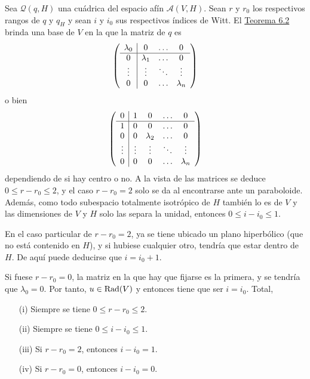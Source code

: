 \documentclass[12pt]{report}
\theoremstyle{definition}
\theoremstyle{definition}
\theoremstyle{remark}
\begin{document}
Sea $\mathcal{Q}(q,H)$ una cuádrica del espacio afín $\mathcal{A}(V,H)$. Sean $r$ y $r_0$ los respectivos rangos de $q$ y $q_H$ y sean $i$ y $i_0$ sus respectivos índices de Witt. El \hyperref[teo6.2.]{\color{blue}Teorema 6.2} brinda una base de $V$ en la que la matriz de $q$ es 
\[\left( \begin{array}{c|ccc}
    \lambda_0 & 0 & \mathellipsis & 0 \\ \hline
    0 & \lambda_1 & \mathellipsis & 0 \\
    \vdots & \vdots & \ddots & \vdots \\
    0 & 0 & \mathellipsis & \lambda_n
\end{array} \right)\]
o bien
\[\left( \begin{array}{c|cccc}
    0 & 1 & 0 & \mathellipsis & 0 \\ \hline
    1 & 0 & 0 & \mathellipsis & 0 \\
    0 & 0 & \lambda_2 & \mathellipsis & 0 \\
    \vdots & \vdots & \vdots & \ddots & \vdots \\
    0 & 0 & 0 & \mathellipsis & \lambda_n
\end{array} \right)\]
dependiendo de si hay centro o no. A la vista de las matrices se deduce $0 \leq r-r_0 \leq 2$, y el caso $r-r_0 = 2$ solo se da al encontrarse ante un paraboloide. Además, como todo subespacio totalmente isotrópico de $H$ también lo es de $V$ y las dimensiones de $V$ y $H$ solo las separa la unidad, entonces $0 \leq i-i_0 \leq 1$.

\vspace{2mm}
En el caso particular de $r-r_0 = 2$, ya se tiene ubicado un plano hiperbólico (que no está contenido en $H$), y si hubiese cualquier otro, tendría que estar dentro de $H$. De aquí puede deducirse que $i = i_0 + 1$.

\vspace{2mm}
Si fuese $r-r_0 = 0$, la matriz en la que hay que fijarse es la primera, y se tendría que $\lambda_0 = 0$. Por tanto, $u \in \textup{Rad}(V)$ y entonces tiene que ser $i = i_0$. Total,
\begin{itemize}
    \item[(i)] Siempre se tiene $ 0 \leq r-r_0 \leq 2$.
    \item[(ii)] Siempre se tiene $0 \leq i-i_0 \leq 1$.
    \item[(iii)] Si $r-r_0 = 2$, entonces $i - i_0 = 1$.
    \item[(iv)] Si $r - r_0 = 0$, entonces $i - i_0 = 0$.
\end{itemize}
\end{document}
